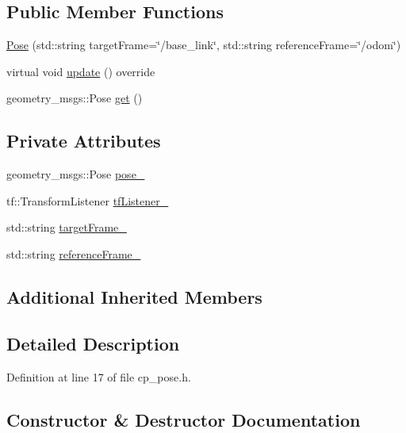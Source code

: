\subsection*{Public Member Functions}
\begin{DoxyCompactItemize}
\item 
\hyperlink{classcl__move__base__z_1_1Pose_a4a98f13e98799773e1b37b2ae3d1b695}{Pose} (std\+::string target\+Frame=\char`\"{}/base\+\_\+link\char`\"{}, std\+::string reference\+Frame=\char`\"{}/odom\char`\"{})
\item 
virtual void \hyperlink{classcl__move__base__z_1_1Pose_abf99d1127cf51a93f97ada2031196114}{update} () override
\item 
geometry\+\_\+msgs\+::\+Pose \hyperlink{classcl__move__base__z_1_1Pose_a6e3d311de54516653d773d9b7eb1d85d}{get} ()
\end{DoxyCompactItemize}
\subsection*{Private Attributes}
\begin{DoxyCompactItemize}
\item 
geometry\+\_\+msgs\+::\+Pose \hyperlink{classcl__move__base__z_1_1Pose_a07159b1632042a0292ffcc39995da81e}{pose\+\_\+}
\item 
tf\+::\+Transform\+Listener \hyperlink{classcl__move__base__z_1_1Pose_a6d669632db37e0e51734d2a65e8dcd41}{tf\+Listener\+\_\+}
\item 
std\+::string \hyperlink{classcl__move__base__z_1_1Pose_a01d338f9dbadc597aaea84853d333690}{target\+Frame\+\_\+}
\item 
std\+::string \hyperlink{classcl__move__base__z_1_1Pose_a6a7a593232b6edaf99103d48ad8da9d3}{reference\+Frame\+\_\+}
\end{DoxyCompactItemize}
\subsection*{Additional Inherited Members}


\subsection{Detailed Description}


Definition at line 17 of file cp\+\_\+pose.\+h.



\subsection{Constructor \& Destructor Documentation}
